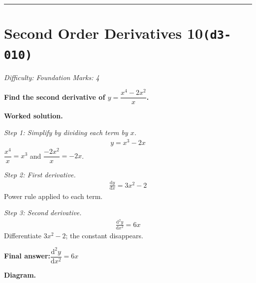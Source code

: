\documentclass[11pt]{article}
\newcommand{\question}[1]{\par\medskip\noindent\textbf{#1}\par}
\begin{document}
\medskip\hrule

\section*{Second Order Derivatives 10\quad\small\texttt{(d3-010)}}
\textit{Difficulty: Foundation \quad\textbar\quad Marks: 4}

\question{Find the second derivative of \( y = \dfrac{x^4 - 2x^2}{x} \).}

\textbf{Worked solution.}

\textit{Step 1: Simplify by dividing each term by \( x \).}
\[\begin{gathered}
y = x^3 - 2x
\end{gathered}\]
\( \dfrac{x^4}{x} = x^3 \) and \( \dfrac{-2x^2}{x} = -2x \).

\textit{Step 2: First derivative.}
\[\begin{gathered}
\frac{\mathrm{d}y}{\mathrm{d}x} = 3x^2 - 2
\end{gathered}\]
Power rule applied to each term.

\textit{Step 3: Second derivative.}
\[\begin{gathered}
\frac{\mathrm{d}^2y}{\mathrm{d}x^2} = 6x
\end{gathered}\]
Differentiate \(3x^2 - 2\); the constant disappears.

\begin{answerbox}
\textbf{Final answer:}\quad \(\displaystyle  \dfrac{\mathrm{d}^2y}{\mathrm{d}x^2} = 6x \)
\end{answerbox}
\textbf{Diagram.}
\end{document}
